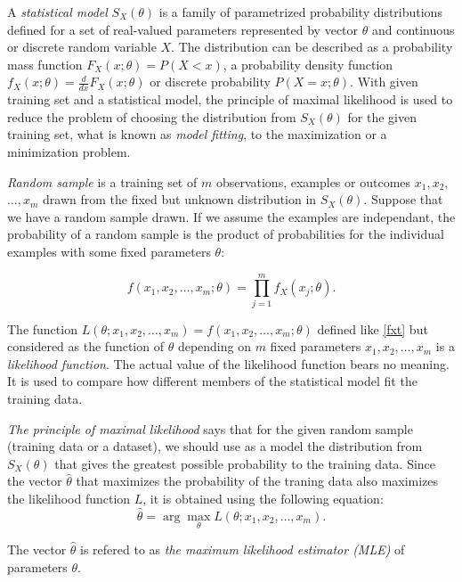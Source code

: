 \documentclass[times, utf8, zavrsni]{fer}
\newcommand{\argmax}{\arg\!\max}
\begin{document}
A \emph{statistical model} $S_X(\theta)$ is a family of parametrized probability distributions defined for a set of real-valued parameters represented by vector $\theta$ and continuous or discrete random variable $X$. The distribution can be described  as a probability mass function $F_X(x;\theta) = P(X < x)$, a probability density function $f_X(x;\theta) = \frac{d}{dx}F_X(x;\theta)$ or discrete probability  $P(X = x; \theta)$. With given training set and a statistical model, the principle of maximal likelihood is used to reduce the problem of choosing the distribution from $S_X(\theta)$ for the given training set, what is known as \emph{model fitting}, to the maximization or a minimization problem.

 \emph{Random sample} is a training set of $m$ observations, examples or outcomes $x_1, x_2,$ $\dots, x_m$ drawn from the fixed but unknown distribution in $S_X(\theta)$. Suppose that we have a random sample drawn. If we assume the examples are independant, the probability of a random sample is the product of probabilities for the individual examples with some fixed parameters $\theta$:

\begin{equation}
\label{fxt}
 f(x_1, x_2, \dots, x_m; \theta) = \prod_{j=1}^{m}{f_{X}(x_j; \theta )}. 
\end{equation}

The function $L(\theta; x_1, x_2, \dots, x_m) = f(x_1, x_2, \dots, x_m; \theta)$ defined like \eqref{fxt} but considered as the function of $\theta$ depending on $m$ fixed parameters $x_1, x_2, \dots, x_m$ is a \emph{likelihood function}. The actual value of the likelihood function bears no meaning. It is used to compare how different members of the statistical model fit the training data. 

\emph{The principle of maximal likelihood} says that for the given random sample (training data or a dataset), we should use as a model the distribution from $S_X(\theta)$ that gives the greatest possible probability to the training data. Since the vector $\hat\theta$ that maximizes the probability of the traning data also maximizes the likelihood function $L$, it is obtained using the following equation:
\begin{equation}
\label{MLE}
 \hat\theta = \argmax_{\theta} L(\theta; x_1, x_2, \dots, x_m).
\end{equation}

The vector $\hat\theta$ is refered to as \emph{the maximum likelihood estimator (MLE)} of parameters $\theta$. 
\end{document}
